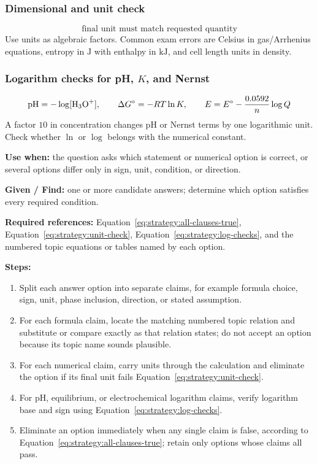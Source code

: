 \subsubsection{Dimensional and unit check}
\begin{equation}\label{eq:strategy:unit-check}
\text{final unit must match requested quantity}
\end{equation}
Use units as algebraic factors. Common exam errors are Celsius in gas/Arrhenius equations, entropy in \(\mathrm J\) with enthalpy in \(\mathrm{kJ}\), and cell length units in density.

\subsubsection{Logarithm checks for pH, \(K\), and Nernst}
\begin{equation}\label{eq:strategy:log-checks}
\mathrm{pH}=-\log[\ce{H3O+}], \qquad
\Delta G^\circ=-RT\ln K, \qquad
E=E^\circ-\frac{0.0592}{n}\log Q
\end{equation}
A factor \(10\) in concentration changes pH or Nernst terms by one logarithmic unit. Check whether \(\ln\) or \(\log\) belongs with the numerical constant.

\textbf{Use when:} the question asks which statement or numerical option is correct, or several options differ only in sign, unit, condition, or direction.

\textbf{Given / Find:} one or more candidate answers; determine which option satisfies every required condition.

\textbf{Required references:} Equation~\eqref{eq:strategy:all-clauses-true}, Equation~\eqref{eq:strategy:unit-check}, Equation~\eqref{eq:strategy:log-checks}, and the numbered topic equations or tables named by each option.

\textbf{Steps:}
\begin{enumerate}
    \item Split each answer option into separate claims, for example formula choice, sign, unit, phase inclusion, direction, or stated assumption.
    \item For each formula claim, locate the matching numbered topic relation and substitute or compare exactly as that relation states; do not accept an option because its topic name sounds plausible.
    \item For each numerical claim, carry units through the calculation and eliminate the option if its final unit fails Equation~\eqref{eq:strategy:unit-check}.
    \item For pH, equilibrium, or electrochemical logarithm claims, verify logarithm base and sign using Equation~\eqref{eq:strategy:log-checks}.
    \item Eliminate an option immediately when any single claim is false, according to Equation~\eqref{eq:strategy:all-clauses-true}; retain only options whose claims all pass.
\end{enumerate}

